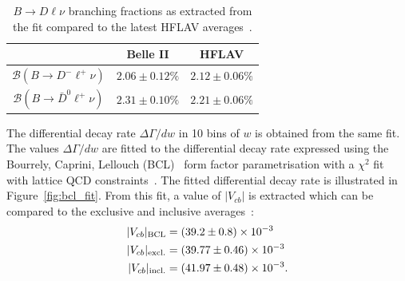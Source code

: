 \documentclass{moriond}
\def\bea{\begin{eqnarray}}
\def\eea{\end{eqnarray}}
\def\vcb{V_{cb}}
\def\btodlnu{B \to D\ell\nu}
\begin{document}
\begin{table}[h!]
    \centering
    \caption{$\btodlnu$ branching fractions as extracted from the fit compared to the latest HFLAV averages~\cite{hflav}.}
    \begin{tabular}{|c c c|}
         \hline
         & Belle II & HFLAV \\
         \hline
        $\mathcal{B}(B \to D^- \ell^+ \nu)$ & $2.06 \pm 0.12 \%$ & $2.12 \pm 0.06 \%$ \\
        $\mathcal{B}(B \to \bar{D}^0 \ell^+ \nu)$ & $2.31 \pm 0.10 \%$ & $2.21 \pm 0.06 \%$ \\
         \hline
    \end{tabular}
    \label{tab:br}
\end{table}
The differential decay rate $\Delta\Gamma/dw$ in 10 bins of $w$ is obtained from the same fit. The values $\Delta\Gamma/dw$ are fitted to the differential decay rate expressed using the Bourrely, Caprini, Lellouch (BCL)~\cite{bcl} form factor parametrisation with a $\chi^2$ fit with lattice QCD constraints~\cite{fmilc, hpqcd}. The fitted differential decay rate is illustrated in Figure~\ref{fig:bcl_fit}. From this fit, a value of $|\vcb|$ is extracted which can be compared to the exclusive and inclusive averages~\cite{hflav}:
\bea
    |\vcb|_{\rm BCL} &= (39.2 \pm 0.8) \times 10^{-3} \\
    |\vcb|_{\rm excl.} &= (39.77 \pm 0.46) \times 10^{-3} \\
    |\vcb|_{\rm incl.} &= (41.97 \pm 0.48) \times 10^{-3}.
\eea
\end{document}
